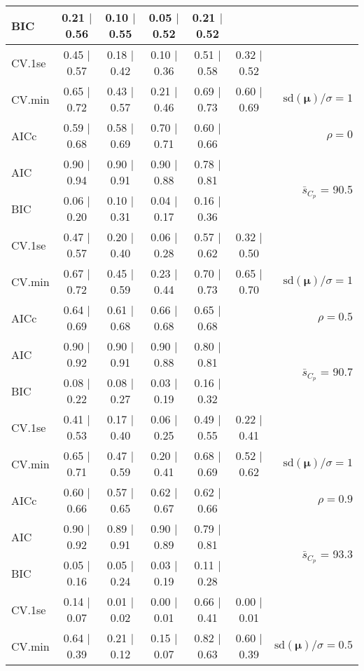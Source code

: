 \documentclass[12pt]{article}
\newcommand{\mr}[1]{\mathrm{#1}}
\newcommand{\bm}[1]{\mathbf{#1}}
\begin{document}
\begin{table}[p]
\begin{center}
\begin{tabular}{l*{5}{c}|r}
BIC & 0.21 $\mid$ 0.56 & 0.10 $\mid$ 0.55 & 0.05 $\mid$ 0.52 & 0.21 $\mid$ 0.52 & & \\
 \hline 
CV.1se & 0.45 $\mid$ 0.57 & 0.18 $\mid$ 0.42 & 0.10 $\mid$ 0.36 & 0.51 $\mid$ 0.58 & 0.32 $\mid$ 0.52 &\\
CV.min & 0.65 $\mid$ 0.72 & 0.43 $\mid$ 0.57 & 0.21 $\mid$ 0.46 & 0.69 $\mid$ 0.73 & 0.60 $\mid$ 0.69 &  $\mr{sd}(\bm{\mu})/\sigma=1$ \\
AICc & 0.59 $\mid$ 0.68 & 0.58 $\mid$ 0.69 & 0.70 $\mid$ 0.71 & 0.60 $\mid$ 0.66 & & $\rho=0$ \\
AIC & 0.90 $\mid$ 0.94 & 0.90 $\mid$ 0.91 & 0.90 $\mid$ 0.88 & 0.78 $\mid$ 0.81 & & \multirow{2}{*}{$\bar{s}_{C_p}$ = 90.5} \\
BIC & 0.06 $\mid$ 0.20 & 0.10 $\mid$ 0.31 & 0.04 $\mid$ 0.17 & 0.16 $\mid$ 0.36 & & \\
 \hline 
CV.1se & 0.47 $\mid$ 0.57 & 0.20 $\mid$ 0.40 & 0.06 $\mid$ 0.28 & 0.57 $\mid$ 0.62 & 0.32 $\mid$ 0.50 &\\
CV.min & 0.67 $\mid$ 0.72 & 0.45 $\mid$ 0.59 & 0.23 $\mid$ 0.44 & 0.70 $\mid$ 0.73 & 0.65 $\mid$ 0.70 &  $\mr{sd}(\bm{\mu})/\sigma=1$ \\
AICc & 0.64 $\mid$ 0.69 & 0.61 $\mid$ 0.68 & 0.66 $\mid$ 0.68 & 0.65 $\mid$ 0.68 & & $\rho=0.5$ \\
AIC & 0.90 $\mid$ 0.92 & 0.90 $\mid$ 0.91 & 0.90 $\mid$ 0.88 & 0.80 $\mid$ 0.81 & & \multirow{2}{*}{$\bar{s}_{C_p}$ = 90.7} \\
BIC & 0.08 $\mid$ 0.22 & 0.08 $\mid$ 0.27 & 0.03 $\mid$ 0.19 & 0.16 $\mid$ 0.32 & & \\
 \hline 
CV.1se & 0.41 $\mid$ 0.53 & 0.17 $\mid$ 0.40 & 0.06 $\mid$ 0.25 & 0.49 $\mid$ 0.55 & 0.22 $\mid$ 0.41 &\\
CV.min & 0.65 $\mid$ 0.71 & 0.47 $\mid$ 0.59 & 0.20 $\mid$ 0.41 & 0.68 $\mid$ 0.69 & 0.52 $\mid$ 0.62 &  $\mr{sd}(\bm{\mu})/\sigma=1$ \\
AICc & 0.60 $\mid$ 0.66 & 0.57 $\mid$ 0.65 & 0.62 $\mid$ 0.67 & 0.62 $\mid$ 0.66 & & $\rho=0.9$ \\
AIC & 0.90 $\mid$ 0.92 & 0.89 $\mid$ 0.91 & 0.90 $\mid$ 0.89 & 0.79 $\mid$ 0.81 & & \multirow{2}{*}{$\bar{s}_{C_p}$ = 93.3} \\
BIC & 0.05 $\mid$ 0.16 & 0.05 $\mid$ 0.24 & 0.03 $\mid$ 0.19 & 0.11 $\mid$ 0.28 & & \\
 \hline 
CV.1se & 0.14 $\mid$ 0.07 & 0.01 $\mid$ 0.02 & 0.00 $\mid$ 0.01 & 0.66 $\mid$ 0.41 & 0.00 $\mid$ 0.01 &\\
CV.min & 0.64 $\mid$ 0.39 & 0.21 $\mid$ 0.12 & 0.15 $\mid$ 0.07 & 0.82 $\mid$ 0.63 & 0.60 $\mid$ 0.39 &  $\mr{sd}(\bm{\mu})/\sigma=0.5$ \\

\end{tabular}
\end{center}
\end{table}
\end{document}
